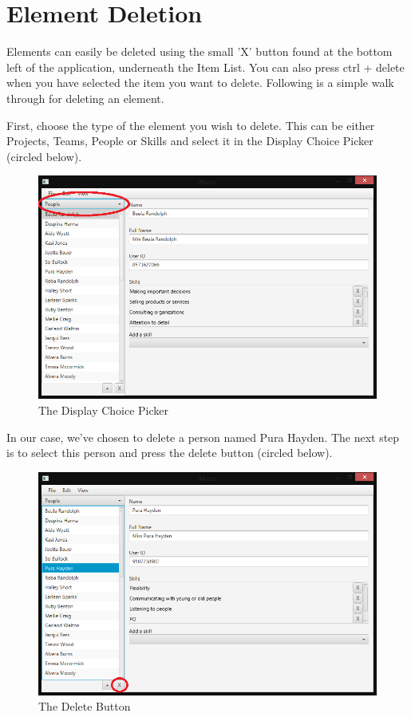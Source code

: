 \section{Element Deletion}

Elements can easily be deleted using the small 'X' button found at the bottom left of the application, underneath the Item List. You can also press ctrl + delete when you have selected the item you want to delete. Following is a simple walk through for deleting an element.

First, choose the type of the element you wish to delete. This can be either Projects, Teams, People or Skills and select it in the Display Choice Picker (circled below).

\begin{figure}[H]
\centering
\includegraphics[width=\textwidth]{images/screenshots/deletion1.PNG}
\caption{The Display Choice Picker}
\label{fig:new_project}
\end{figure}

In our case, we've chosen to delete a person named Pura Hayden. The next step is to select this person and press the delete button (circled below).

\begin{figure}[H]
\centering
\includegraphics[width=\textwidth]{images/screenshots/deletion2.PNG}
\caption{The Delete Button}
\label{fig:new_project}
\end{figure}

